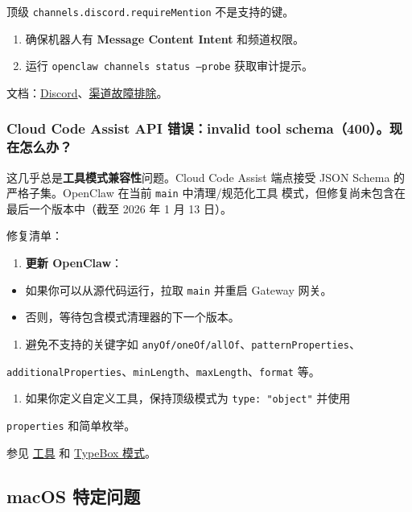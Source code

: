 顶级 \texttt{channels.discord.requireMention} 不是支持的键。
\begin{enumerate}
  \item 确保机器人有 \textbf{Message Content Intent} 和频道权限。
  \item 运行 \texttt{openclaw channels status --probe} 获取审计提示。
\end{enumerate}


文档：\href{/channels/discord}{Discord}、\href{/channels/troubleshooting}{渠道故障排除}。

\subsubsection{Cloud Code Assist API 错误：invalid tool schema（400）。现在怎么办？}


这几乎总是\textbf{工具模式兼容性}问题。Cloud Code Assist
端点接受 JSON Schema 的严格子集。OpenClaw 在当前 \texttt{main} 中清理/规范化工具
模式，但修复尚未包含在最后一个版本中（截至
2026 年 1 月 13 日）。

修复清单：

\begin{enumerate}
  \item \textbf{更新 OpenClaw}：
\end{enumerate}

\begin{itemize}
  \item 如果你可以从源代码运行，拉取 \texttt{main} 并重启 Gateway 网关。
  \item 否则，等待包含模式清理器的下一个版本。
\end{itemize}

\begin{enumerate}
  \item 避免不支持的关键字如 \texttt{anyOf/oneOf/allOf}、\texttt{patternProperties}、
\end{enumerate}

\texttt{additionalProperties}、\texttt{minLength}、\texttt{maxLength}、\texttt{format} 等。
\begin{enumerate}
  \item 如果你定义自定义工具，保持顶级模式为 \texttt{type: "object"} 并使用
\end{enumerate}

\texttt{properties} 和简单枚举。

参见 \href{/tools}{工具} 和 \href{/concepts/typebox}{TypeBox 模式}。

\subsection{macOS 特定问题}


